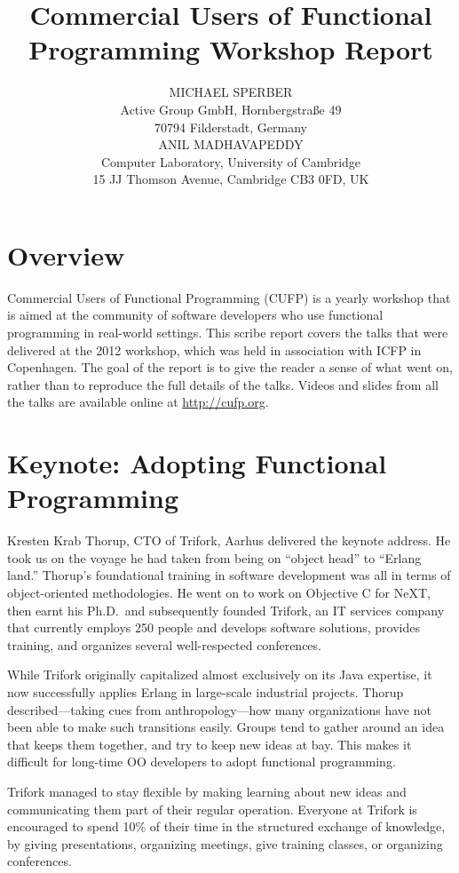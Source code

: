 \documentclass{jfp1}
\title[Commercial Users of Functional Programming 2012]
      {Commercial Users of Functional Programming Workshop Report}
\author[Michael Sperber and Anil Madhavapeddy]
       {MICHAEL SPERBER\\
         Active Group GmbH, Hornbergstra\ss{}e 49\\
         70794 Filderstadt, Germany\\
         ANIL MADHAVAPEDDY\\
        Computer Laboratory, University of Cambridge\\ 
        15 JJ Thomson Avenue, Cambridge CB3 0FD, UK}
\begin{document}
\label{firstpage}
\maketitle

\section{Overview}

Commercial Users of Functional Programming (CUFP) is a yearly workshop
that is aimed at the community of software developers who use functional
programming in real-world settings.  This scribe report covers the talks
that were delivered at the 2012 workshop, which was held in association
with ICFP in Copenhagen.  The goal of the report is to give the reader
a sense of what went on, rather than to reproduce the full details
of the talks.  Videos and slides from all the talks are available online at \url{http://cufp.org}.

\section{Keynote: Adopting Functional Programming}

Kresten Krab Thorup, CTO of Trifork, Aarhus delivered the keynote address.
He took us on the voyage he had taken from being on ``object head''
to ``Erlang land.''  Thorup's foundational training in software
development was all in terms of object-oriented methodologies.  He
went on to work on Objective C for NeXT, then earnt his Ph.D.\
and subsequently founded Trifork, an IT services company that currently
employs 250 people and develops software solutions, provides training, and
organizes several well-respected conferences.

While Trifork originally capitalized almost exclusively on its Java
expertise, it now successfully applies Erlang in large-scale
industrial projects.  Thorup described---taking cues from
anthropology---how many organizations have not been able to make such transitions
easily. Groups tend to gather around an idea that keeps them together,
and try to keep new ideas at bay.  This makes it difficult for
long-time OO developers to adopt functional programming.

Trifork managed to stay flexible by making learning about new ideas
and communicating them part of their regular operation.  Everyone at
Trifork is encouraged to spend 10\% of their time in the structured
exchange of knowledge, by giving presentations, organizing meetings,
give training classes, or organizing conferences.
\end{document}
